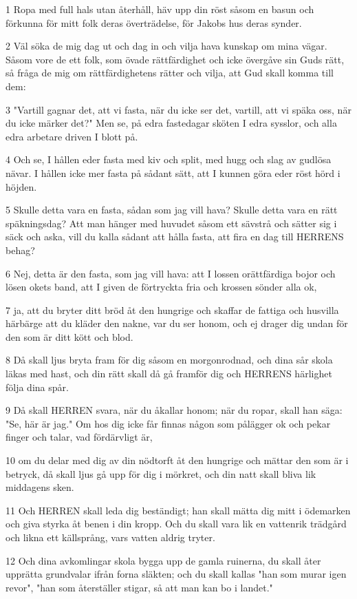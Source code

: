 \par 1 Ropa med full hals utan återhåll, häv upp din röst såsom en basun och förkunna för mitt folk deras överträdelse, för Jakobs hus deras synder.
\par 2 Väl söka de mig dag ut och dag in och vilja hava kunskap om mina vägar. Såsom vore de ett folk, som övade rättfärdighet och icke övergåve sin Guds rätt, så fråga de mig om rättfärdighetens rätter och vilja, att Gud skall komma till dem:
\par 3 "Vartill gagnar det, att vi fasta, när du icke ser det, vartill, att vi späka oss, när du icke märker det?" Men se, på edra fastedagar sköten I edra sysslor, och alla edra arbetare driven I blott på.
\par 4 Och se, I hållen eder fasta med kiv och split, med hugg och slag av gudlösa nävar. I hållen icke mer fasta på sådant sätt, att I kunnen göra eder röst hörd i höjden.
\par 5 Skulle detta vara en fasta, sådan som jag vill hava? Skulle detta vara en rätt späkningsdag? Att man hänger med huvudet såsom ett sävstrå och sätter sig i säck och aska, vill du kalla sådant att hålla fasta, att fira en dag till HERRENS behag?
\par 6 Nej, detta är den fasta, som jag vill hava: att I lossen orättfärdiga bojor och lösen okets band, att I given de förtryckta fria och krossen sönder alla ok,
\par 7 ja, att du bryter ditt bröd åt den hungrige och skaffar de fattiga och husvilla härbärge att du kläder den nakne, var du ser honom, och ej drager dig undan för den som är ditt kött och blod.
\par 8 Då skall ljus bryta fram för dig såsom en morgonrodnad, och dina sår skola läkas med hast, och din rätt skall då gå framför dig och HERRENS härlighet följa dina spår.
\par 9 Då skall HERREN svara, när du åkallar honom; när du ropar, skall han säga: "Se, här är jag." Om hos dig icke får finnas någon som pålägger ok och pekar finger och talar, vad fördärvligt är,
\par 10 om du delar med dig av din nödtorft åt den hungrige och mättar den som är i betryck, då skall ljus gå upp för dig i mörkret, och din natt skall bliva lik middagens sken.
\par 11 Och HERREN skall leda dig beständigt; han skall mätta dig mitt i ödemarken och giva styrka åt benen i din kropp. Och du skall vara lik en vattenrik trädgård och likna ett källsprång, vars vatten aldrig tryter.
\par 12 Och dina avkomlingar skola bygga upp de gamla ruinerna, du skall åter upprätta grundvalar ifrån forna släkten; och du skall kallas "han som murar igen revor", "han som återställer stigar, så att man kan bo i landet."
